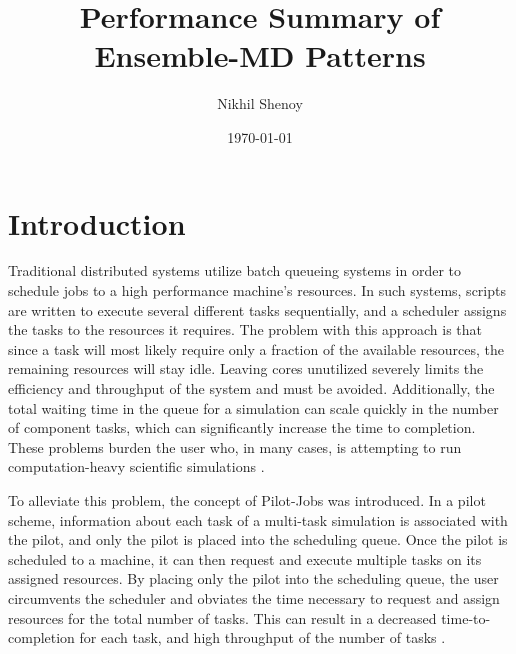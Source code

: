 \documentclass[]{article}
\begin{document}
\title{Performance Summary of Ensemble-MD Patterns}
\author{Nikhil Shenoy}
\date{\today}
\maketitle


\section{Introduction}

	Traditional distributed systems utilize batch queueing systems in order to schedule jobs to a high performance machine's resources. In such systems, scripts are written to execute several different tasks sequentially, and a scheduler assigns the tasks to the resources it requires. The problem with this approach is that since a task will most likely require only a fraction of the available resources, the remaining resources will stay idle. Leaving cores unutilized severely limits the efficiency and throughput of the system and must be avoided. Additionally, the total waiting time in the queue for a simulation can scale quickly in the number of component tasks, which can significantly increase the time to completion. These problems burden the user who, in many cases, is attempting to run computation-heavy scientific simulations \cite{vishal_shah_paper}.

	To alleviate this problem, the concept of Pilot-Jobs was introduced. In a pilot scheme, information about each task of a multi-task simulation is associated with the pilot, and only the pilot is placed into the scheduling queue. Once the pilot is scheduled to a machine, it can then request and execute multiple tasks on its assigned resources. By placing only the pilot into the scheduling queue, the user circumvents the scheduler and obviates the time necessary to request and assign resources for the total number of tasks. This can result in a decreased time-to-completion for each task, and high throughput of the number of tasks \cite{rp_paper}.
\end{document}
